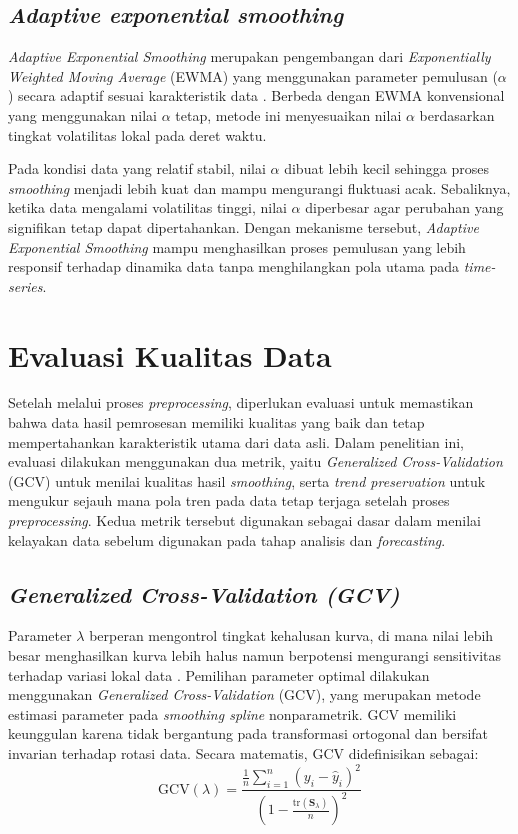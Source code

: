 \subsection{\textit{Adaptive exponential smoothing}}
\textit{Adaptive Exponential Smoothing} merupakan pengembangan dari \textit{Exponentially Weighted Moving Average} (EWMA) yang menggunakan parameter pemulusan ($\alpha$) secara adaptif sesuai karakteristik data \citep{andrasto2023}. Berbeda dengan EWMA konvensional yang menggunakan nilai $\alpha$ tetap, metode ini menyesuaikan nilai $\alpha$ berdasarkan tingkat volatilitas lokal pada deret waktu.

Pada kondisi data yang relatif stabil, nilai $\alpha$ dibuat lebih kecil sehingga proses \textit{smoothing} menjadi lebih kuat dan mampu mengurangi fluktuasi acak. Sebaliknya, ketika data mengalami volatilitas tinggi, nilai $\alpha$ diperbesar agar perubahan yang signifikan tetap dapat dipertahankan. Dengan mekanisme tersebut, \textit{Adaptive Exponential Smoothing} mampu menghasilkan proses pemulusan yang lebih responsif terhadap dinamika data tanpa menghilangkan pola utama pada \textit{time-series}.

\section{Evaluasi Kualitas Data}
Setelah melalui proses \textit{preprocessing}, diperlukan evaluasi untuk memastikan bahwa data hasil pemrosesan memiliki kualitas yang baik dan tetap mempertahankan karakteristik utama dari data asli. Dalam penelitian ini, evaluasi dilakukan menggunakan dua metrik, yaitu \textit{Generalized Cross-Validation} (GCV) untuk menilai kualitas hasil \textit{smoothing}, serta \textit{trend preservation} untuk mengukur sejauh mana pola tren pada data tetap terjaga setelah proses \textit{preprocessing}. Kedua metrik tersebut digunakan sebagai dasar dalam menilai kelayakan data sebelum digunakan pada tahap analisis dan \textit{forecasting}.

\subsection{\textit{Generalized Cross-Validation (GCV)}}
Parameter $\lambda$ berperan mengontrol tingkat kehalusan kurva, di mana nilai lebih besar menghasilkan kurva lebih halus namun berpotensi mengurangi sensitivitas terhadap variasi lokal data \citep{wust2017}. Pemilihan parameter optimal dilakukan menggunakan \textit{Generalized Cross-Validation} (GCV), yang merupakan metode estimasi parameter pada \textit{smoothing spline} nonparametrik. GCV memiliki keunggulan karena tidak bergantung pada transformasi ortogonal dan bersifat invarian terhadap rotasi data. Secara matematis, GCV didefinisikan sebagai:
\begin{equation}
    \text{GCV}(\lambda) = \frac{\frac{1}{n} \sum_{i=1}^{n} \left( y_i - \hat{y}_i \right)^2}{\left( 1 - \frac{\text{tr}(\mathbf{S}_\lambda)}{n} \right)^2}
\end{equation}

